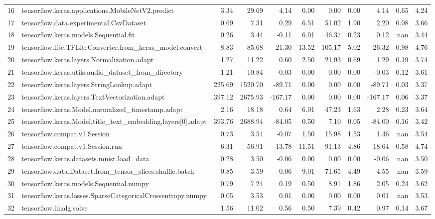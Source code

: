 \begin{tabular}{llrrrrrrrrr}
16 & tensorflow.keras.applications.MobileNetV2.predict & 3.34 & 29.69 & 4.14 & 0.00 & 0.00 & 0.00 & 4.14 & 0.65 & 4.24 \\
17 & tensorflow.data.experimental.CsvDataset & 0.69 & 7.31 & 0.29 & 6.51 & 51.02 & 1.90 & 2.20 & 0.08 & 3.66 \\
18 & tensorflow.keras.models.Sequential.fit & 0.26 & 3.44 & -0.11 & 6.01 & 46.37 & 0.23 & 0.12 & nan & 3.44 \\
19 & tensorflow.lite.TFLiteConverter.from_keras_model.convert & 8.83 & 85.68 & 21.30 & 13.52 & 105.17 & 5.02 & 26.32 & 0.98 & 4.76 \\
20 & tensorflow.keras.layers.Normalization.adapt & 1.27 & 11.22 & 0.60 & 2.50 & 21.93 & 0.69 & 1.29 & 0.19 & 3.74 \\
21 & tensorflow.keras.utils.audio_dataset_from_directory & 1.21 & 10.84 & -0.03 & 0.00 & 0.00 & 0.00 & -0.03 & 0.12 & 3.61 \\
22 & tensorflow.keras.layers.StringLookup.adapt & 225.69 & 1520.70 & -89.71 & 0.00 & 0.00 & 0.00 & -89.71 & 0.03 & 3.37 \\
23 & tensorflow.keras.layers.TextVectorization.adapt & 397.12 & 2675.93 & -167.17 & 0.00 & 0.00 & 0.00 & -167.17 & 0.06 & 3.37 \\
24 & tensorflow.keras.Model.normalized_timestamp.adapt & 2.16 & 18.18 & 0.64 & 6.01 & 47.23 & 1.63 & 2.28 & 0.23 & 3.64 \\
25 & tensorflow.keras.Model.title_text_embedding.layers[0].adapt & 393.76 & 2688.94 & -84.05 & 0.50 & 7.10 & 0.05 & -84.00 & 0.16 & 3.42 \\
26 & tensorflow.compat.v1.Session & 0.73 & 3.54 & -0.07 & 1.50 & 15.98 & 1.53 & 1.46 & nan & 3.54 \\
27 & tensorflow.compat.v1.Session.run & 6.31 & 56.91 & 13.78 & 11.51 & 91.13 & 4.86 & 18.64 & 0.58 & 4.74 \\
28 & tensorflow.keras.datasets.mnist.load_data & 0.28 & 3.50 & -0.06 & 0.00 & 0.00 & 0.00 & -0.06 & nan & 3.50 \\
29 & tensorflow.data.Dataset.from_tensor_slices.shuffle.batch & 0.85 & 3.59 & 0.06 & 9.01 & 71.65 & 4.49 & 4.55 & nan & 3.59 \\
30 & tensorflow.keras.models.Sequential.numpy & 0.79 & 7.24 & 0.19 & 0.50 & 8.91 & 1.86 & 2.05 & 0.24 & 3.62 \\
31 & tensorflow.keras.losses.SparseCategoricalCrossentropy.numpy & 0.05 & 3.53 & 0.01 & 0.00 & 0.00 & 0.00 & 0.01 & nan & 3.53 \\
32 & tensorflow.linalg.solve & 1.56 & 11.02 & 0.56 & 0.50 & 7.39 & 0.42 & 0.97 & 0.14 & 3.67 \\

\end{tabular}
